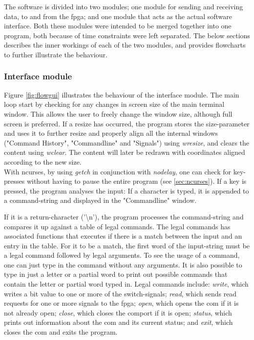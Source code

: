 \documentclass[main.tex]{subfiles}
\begin{document}
The software is divided into two modules; one module for sending and receiving data, to and from the \gls{fpga}; and one module that acts as the actual software interface. Both these modules were intended to be merged together into one program, both because of time constraints were left separated. The below sections describes the inner workings of each of the two modules, and provides flowcharts to further illustrate the behaviour.

\subsubsection{Interface module}
Figure \ref{fig:flowgui} illustrates the behaviour of the interface module. The main loop start by checking for any changes in screen size of the main terminal window. This allows the user to freely change the window size, although full screen is preferred. If a resize has occurred, the program stores the size-parameter and uses it to further resize and properly align all the internal windows ("Command History", "Commandline" and "Signals") using \textit{wresize}, and clears the content using \textit{wclear}. The content will later be redrawn with coordinates aligned according to the new size.\\

With ncurses, by using \textit{getch} in conjunction with \textit{nodelay}, one can check for key-presses without having to pause the entire program (see \ref{sec:ncurses}). If a key is pressed, the program analyses the input: If a character is typed, it is appended to a command-string and displayed in the "Commandline" window. 

If it is a return-character ('\textbackslash n'), the program processes the command-string and compares it up against a table of legal commands. The legal commands has associated functions that executes if there is a match between the input and an entry in the table. For it to be a match, the first word of the input-string must be a legal command followed by legal arguments. To see the usage of a command, one can just type in the command without any arguments. It is also possible to type in just a letter or a partial word to print out possible commands that contain the letter or partial word typed in. Legal commands include: \textit{write}, which writes a bit value to one or more of the switch-signals; \textit{read}, which sends read requests for one or more signals to the \gls{fpga}; \textit{open}, which opens the \gls{com} if it is not already open; \textit{close}, which closes the comport if it is open; \textit{status}, which prints out information about the \gls{com} and its current status; and \textit{exit}, which closes the \gls{com} and exits the program.
\end{document}
